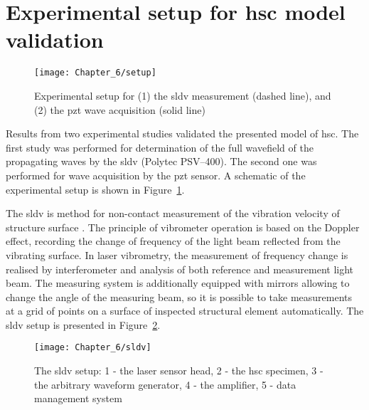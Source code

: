 \section{Experimental setup for \acl{hsc} model validation}
\label{sec:setup}
\begin{figure}[!htb]
	\begin{center}
		\texttt{[image: Chapter\_6/setup]}
	\end{center}
	\caption{Experimental setup for (1) the \acf{sldv} measurement (dashed line), and (2) the \acf{pzt} wave acquisition (solid line)}
	\label{fig:setup}
\end{figure}
Results from two experimental studies validated the presented model of \ac{hsc}.
The first study was performed for determination of the full wavefield of the propagating waves by the \ac{sldv} (Polytec PSV–400).
The second one was performed for wave acquisition by the \ac{pzt} sensor.
A schematic of the experimental setup is shown in Figure~\ref{fig:setup}.

The \ac{sldv} is method for non-contact measurement of the vibration velocity of structure surface \cite{staszewski2004structural, zak2012damage}.
The principle of vibrometer operation is based on the Doppler effect, recording the change of frequency of the light beam reflected from the vibrating surface.
In laser vibrometry, the measurement of frequency change is realised by interferometer and analysis of both reference and measurement light beam.
The measuring system is additionally equipped with mirrors allowing to change the angle of the measuring beam, so it is possible to take measurements at a grid of points on a surface of inspected structural element automatically.
The \ac{sldv} setup is presented in Figure~\ref{fig:sldv}.
\begin{figure}[!htb]
	\begin{center}
		\texttt{[image: Chapter\_6/sldv]}
	\end{center}
	\caption{The \acl{sldv} setup: 1 - the laser sensor head, 2 - the \acl{hsc} specimen, 3 - the arbitrary waveform generator, 4 - the amplifier, 5 - data management system}
	\label{fig:sldv}
\end{figure}

